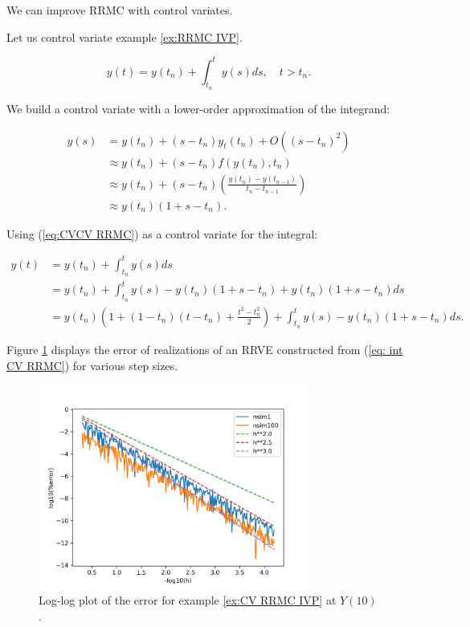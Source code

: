 \documentclass[a4paper,12pt]{article}
\begin{document}
We can improve RRMC with control variates.
\begin{example}[CV RRMC $y_t=y$]\label{ex:CV RRMC IVP}
    Let us control variate example \ref{ex:RRMC IVP}.

    \begin{equation}
        y(t)= y(t_{n}) + \int_{t_{n}}^{t}y(s)ds , \quad t>t_{n}.
    \end{equation}

    We build a control variate with a lower-order approximation
    of the integrand:

    \begin{align}
        y(s) & = y(t_{n}) + (s-t_{n})y_t(t_{n}) + O((s-t_{n})^{2})      \\
             & \approx y(t_{n}) + (s-t_{n})f(y(t_{n}),t_{n})            \\
             & \approx y(t_{n}) +
        (s-t_{n})\left(\frac{y(t_{n})-y(t_{n-1})}{t_{n}-t_{n-1}}\right) \\
             & \approx y(t_{n})(1+s-t_{n}). \label{eq:CVCV RRMC }
    \end{align}

    Using (\ref{eq:CVCV RRMC}) as a control variate for the integral:

    \begin{align}
        y(t) & = y(t_{n}) + \int_{t_{n}}^{t}y(s)ds                                          \\
             & = y(t_{n}) + \int_{t_{n}}^{t}y(s)-y(t_{n})(1+s-t_{n}) +y(t_{n})(1+s-t_{n})ds \\
             & = y(t_{n})\left(1 + (1-t_{n})(t-t_{n})+\frac{t^{2}-t_{n}^{2}}{2}\right)
        + \int_{t_{n}}^{t}y(s)-y(t_{n})(1+s-t_{n})ds. \label{eq: int CV RRMC}
    \end{align}

    Figure \ref{fig:CV RRMC IVP} displays the error
    of realizations of an RRVE constructed from (\ref{eq: int CV RRMC})
    for various step sizes.

    \begin{figure}[h!]
        \centering
        \includegraphics[width=0.8\textwidth]{plots/CV RRMC IVP.png}
        \caption{Log-log plot of the error for example
            \ref{ex:CV RRMC IVP} at $Y(10)$.}
        \label{fig:CV RRMC IVP}
    \end{figure}
\end{example}
\end{document}
